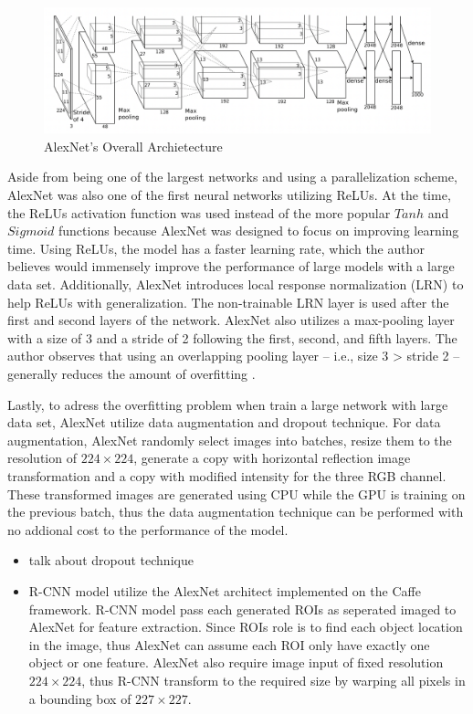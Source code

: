 \begin{figure}[!ht]
    \centering
    \includegraphics[width=6in]{figures/alex_net.png}
    \caption{AlexNet's Overall Archietecture \cite{AlexNet_2017}} \label{fig:alex_net_architecture}
\end{figure}

Aside from being one of the largest networks and using a parallelization scheme, AlexNet was also one of the first neural networks utilizing ReLUs. At the time, the ReLUs activation function was used instead of the more popular $Tanh$ and $Sigmoid$ functions because AlexNet was designed to focus on improving learning time. Using ReLUs, the model has a faster learning rate, which the author believes would immensely improve the performance of large models with a large data set. Additionally, AlexNet introduces local response normalization (LRN) to help ReLUs with generalization. The non-trainable LRN layer is used after the first and second layers of the network. AlexNet also utilizes a max-pooling layer with a size of 3 and a stride of 2 following the first, second, and fifth layers. The author observes that using an overlapping pooling layer -- i.e., size 3 > stride 2 -- generally reduces the amount of overfitting \cite{AlexNet_2017}. 

Lastly, to adress the overfitting problem when train a large network with large data set, AlexNet utilize data augmentation and dropout technique. For data augmentation, AlexNet randomly select images into batches, resize them to the resolution of $224 \times 224$, generate a copy with horizontal reflection image transformation and a copy with modified intensity for the three RGB channel. These transformed images are generated using CPU while the GPU is training on the previous batch, thus the data augmentation technique can be performed with no addional cost to the performance of the model. 

\begin{itemize}
    \item talk about dropout technique
    \item R-CNN model utilize the AlexNet architect implemented on the Caffe framework. R-CNN model pass each generated ROIs as seperated imaged to AlexNet for feature extraction. Since ROIs role is to find each object location in the image, thus AlexNet can assume each ROI only have exactly one object or one feature. AlexNet also require image input of fixed resolution $224 \times 224$, thus R-CNN transform to the required size by warping all pixels in a bounding box of $227 \times 227$.
\end{itemize}





